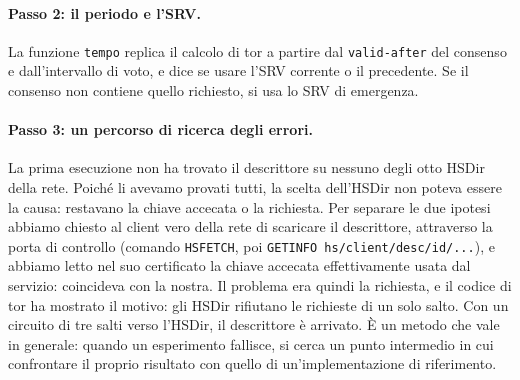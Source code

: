 \paragraph{Passo 2: il periodo e l'SRV.} La funzione \texttt{tempo} replica il calcolo di tor a partire dal \texttt{valid-after} del consenso e dall'intervallo di voto, e dice se usare l'SRV corrente o il precedente. Se il consenso non contiene quello richiesto, si usa lo SRV di emergenza.

\paragraph{Passo 3: un percorso di ricerca degli errori.} La prima esecuzione non ha trovato il descrittore su nessuno degli otto HSDir della rete. Poiché li avevamo provati tutti, la scelta dell'HSDir non poteva essere la causa: restavano la chiave accecata o la richiesta. Per separare le due ipotesi abbiamo chiesto al client vero della rete di scaricare il descrittore, attraverso la porta di controllo (comando \texttt{HSFETCH}, poi \texttt{GETINFO hs/client/desc/id/...}), e abbiamo letto nel suo certificato la chiave accecata effettivamente usata dal servizio: coincideva con la nostra. Il problema era quindi la richiesta, e il codice di tor ha mostrato il motivo: gli HSDir rifiutano le richieste di un solo salto. Con un circuito di tre salti verso l'HSDir, il descrittore è arrivato. È un metodo che vale in generale: quando un esperimento fallisce, si cerca un punto intermedio in cui confrontare il proprio risultato con quello di un'implementazione di riferimento.

